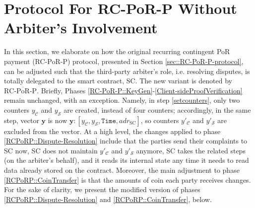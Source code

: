 
\section{Protocol For RC-PoR-P Without Arbiter's Involvement}\label{sec::R-PoR-P-protocol-Withohut-Arbiter}

In this section, we elaborate on how the original recurring contingent PoR payment (RC-PoR-P) protocol, presented in Section \ref{sec::RC-PoR-P-protocol}, can be adjusted such that the third-party arbiter's role, i.e. resolving disputes, is totally delegated to the smart contract, SC.  The new variant is denoted by  ${\text{RC-}\overline{\text{PoR}}\text{-P}}$. Briefly, Phases \ref{RC-PoR-P::KeyGen}-\ref{Client-sideProofVerification} remain  unchanged, with an exception. Namely,   in step \ref{setcounters}, only two counters $y_{\scriptscriptstyle\mathcal{C}}$ and $y_{\scriptscriptstyle\mathcal{S}}$ are created, instead of four counters; accordingly, in the same step,  vector $\bm{y}$ is now   $\bm{y}: [y_{\scriptscriptstyle\mathcal C},y_{\scriptscriptstyle\mathcal S},  \texttt{Time},adr_{\scriptscriptstyle \text{SC}}]$, so counters $y'_{\scriptscriptstyle\mathcal{C}}$ and $y'_{\scriptscriptstyle\mathcal{S}}$  are excluded from the vector. At a high level,  the changes applied to phase \ref{RCPoRP::Dispute-Resolution} include that the parties send their complaints to SC now, SC does not maintain $y'_{\scriptscriptstyle\mathcal{C}}$ and $y'_{\scriptscriptstyle\mathcal{S}}$ anymore, SC takes the related steps  (on the arbiter's behalf), and it reads its internal state any time it needs to read data already stored on the contract. Moreover, the main adjustment to phase  \ref{RCPoRP::CoinTransfer} is that the amounts of coin each party receives  changes. For the sake of clarity, we  present  the modified version of  phases \ref{RCPoRP::Dispute-Resolution} and \ref{RCPoRP::CoinTransfer}, below. 




